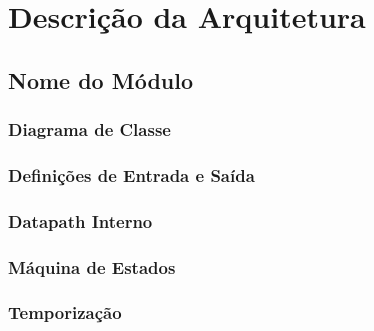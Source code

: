 \documentclass{report}
\begin{document}
\chapter{Descrição da Arquitetura}

  \section{Nome do Módulo}

    \subsection{Diagrama de Classe}

    \subsection{Definições de Entrada e Saída}

    \subsection{Datapath Interno}

    \subsection{Máquina de Estados}

    \subsection{Temporização}


% 
% 
\end{document}
